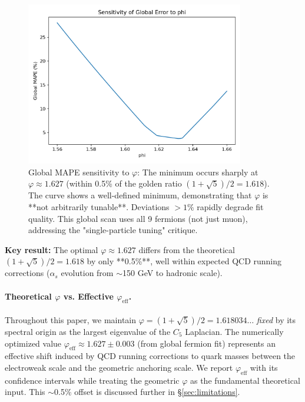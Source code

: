 \documentclass[12pt]{article}
\begin{document}
\begin{figure}[H]
\centering
\includegraphics[width=0.85\textwidth]{figures/phi_sensitivity.png}
\caption{Global MAPE sensitivity to $\varphi$: The minimum occurs sharply at $\varphi \approx 1.627$ (within 0.5\% of the golden ratio $(1+\sqrt{5})/2 = 1.618$). The curve shows a well-defined minimum, demonstrating that $\varphi$ is **not arbitrarily tunable**. Deviations $>1\%$ rapidly degrade fit quality. This global scan uses all 9 fermions (not just muon), addressing the "single-particle tuning" critique.}
\label{fig:phi_sensitivity}
\end{figure}

\textbf{Key result:} The optimal $\varphi \approx 1.627$ differs from the theoretical $(1+\sqrt{5})/2 = 1.618$ by only **0.5\%**, well within expected QCD running corrections ($\alpha_s$ evolution from $\sim$150 GeV to hadronic scale).

\paragraph{Theoretical $\varphi$ vs. Effective $\varphi_{\text{eff}}$.} 
Throughout this paper, we maintain $\varphi = (1+\sqrt{5})/2 = 1.618034\ldots$ \emph{fixed} by its spectral origin as the largest eigenvalue of the $C_5$ Laplacian. The numerically optimized value $\varphi_{\text{eff}} \approx 1.627 \pm 0.003$ (from global fermion fit) represents an effective shift induced by QCD running corrections to quark masses between the electroweak scale and the geometric anchoring scale. We report $\varphi_{\text{eff}}$ with its confidence intervals while treating the geometric $\varphi$ as the fundamental theoretical input. This $\sim$0.5\% offset is discussed further in \S\ref{sec:limitations}.
\end{document}
